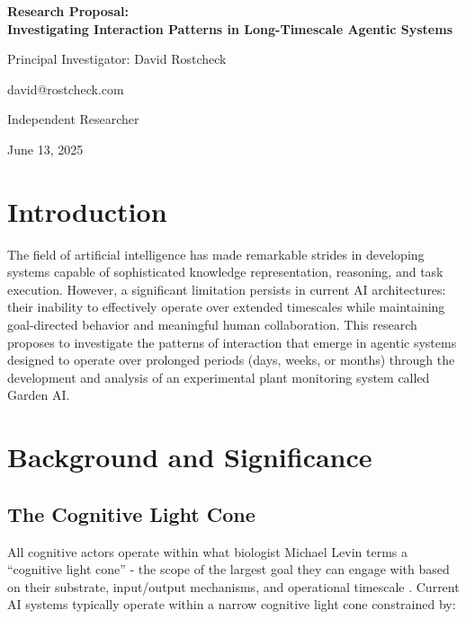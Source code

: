\documentclass[12pt,letterpaper]{article}
\begin{document}
\begin{titlepage}
    \centering
    \vspace*{1cm}
    {\Huge\bfseries Research Proposal:\\Investigating Interaction Patterns in Long-Timescale Agentic Systems\par}
    \vspace{1.5cm}
    {\Large Principal Investigator: David Rostcheck\par}
    {\large david@rostcheck.com\par}
    \vspace{1cm}
    {\large Independent Researcher\par}
    \vspace{0.5cm}
    {\large June 13, 2025\par}
    \vfill
\end{titlepage}

\tableofcontents
\newpage

\section{Introduction}

The field of artificial intelligence has made remarkable strides in developing systems capable of sophisticated knowledge representation, reasoning, and task execution. However, a significant limitation persists in current AI architectures: their inability to effectively operate over extended timescales while maintaining goal-directed behavior and meaningful human collaboration. This research proposes to investigate the patterns of interaction that emerge in agentic systems designed to operate over prolonged periods (days, weeks, or months) through the development and analysis of an experimental plant monitoring system called Garden AI.

\section{Background and Significance}

\subsection{The Cognitive Light Cone}

All cognitive actors operate within what biologist Michael Levin terms a ``cognitive light cone'' - the scope of the largest goal they can engage with based on their substrate, input/output mechanisms, and operational timescale \cite{levin2019}. Current AI systems typically operate within a narrow cognitive light cone constrained by:
\end{document}
